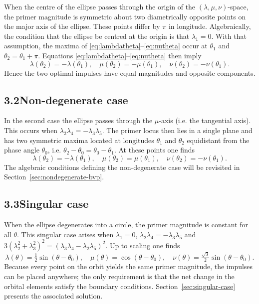 \documentclass[12pt]{article}
\begin{document}
When the centre of the ellipse passes through the origin of the
$(\lambda,\mu,\nu)$-space, the primer magnitude is symmetric about
two diametrically opposite points on the major axis of the ellipse.
These points differ by $\pi$ in longitude.  Algebraically, the
condition that the ellipse be centred at the origin is that
$\lambda_1 = 0$.  With that assumption, the maxima of
\eqref{eq:lambdatheta}--\eqref{eq:nutheta} occur at $\theta_1$ and
$\theta_2 = \theta_1 + \pi$.  Equations
\eqref{eq:lambdatheta}--\eqref{eq:nutheta} then imply
\[
  \lambda(\theta_2) = -\lambda(\theta_1),\quad
  \mu(\theta_2)    = -\mu(\theta_1),\quad
  \nu(\theta_2)    = -\nu(\theta_1).
\]
Hence the two optimal impulses have equal magnitudes and opposite
components.

\subsection*{3.2\quad Non-degenerate case}

In the second case the ellipse passes through the $\mu$-axis (i.e.
the tangential axis).  This occurs when $\lambda_2\lambda_4 =
-\lambda_3\lambda_5$.  The primer locus then lies in a single plane
and has two symmetric maxima located at longitudes $\theta_1$ and
$\theta_2$ equidistant from the phase angle $\theta_0$, i.e. $\theta_2
- \theta_0 = \theta_0 - \theta_1$.  At these points one finds
\[
  \lambda(\theta_2) = -\lambda(\theta_1),\quad
  \mu(\theta_2)    =  \mu(\theta_1),\quad
  \nu(\theta_2)    = -\nu(\theta_1).
\]
The algebraic conditions defining the non-degenerate case will be
revisited in Section~\ref{sec:nondegenerate-bvp}.

\subsection*{3.3\quad Singular case}

When the ellipse degenerates into a circle, the primer magnitude is
constant for all $\theta$.  This singular case arises when
$\lambda_1 = 0$, $\lambda_2\lambda_4 = -\lambda_3\lambda_5$ and
$3 (\lambda_2^2 + \lambda_3^2)^2 = (\lambda_3\lambda_4 -
\lambda_2\lambda_5)^2$.  Up to scaling one finds
\[
  \lambda(\theta) = \tfrac12\sin(\theta - \theta_0),\quad
  \mu(\theta)    =      \cos(\theta - \theta_0),\quad
  \nu(\theta)    = \tfrac{\sqrt{3}}{2}\sin(\theta - \theta_0).
\]
Because every point on the orbit yields the same primer magnitude, the
impulses can be placed anywhere; the only requirement is that the
net change in the orbital elements satisfy the boundary conditions.
Section~\ref{sec:singular-case} presents the associated solution.
\end{document}

